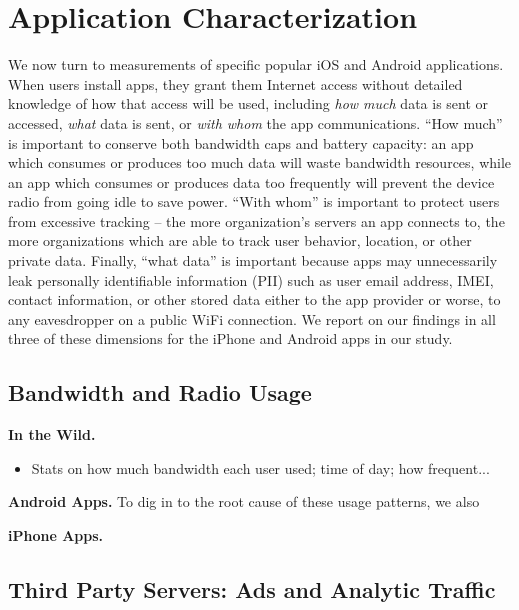 \section{Application Characterization}
\label{sec:characterize-app}

  We now turn to measurements of specific popular iOS and Android applications. 
  When users install apps, they grant them Internet access without detailed knowledge of how that access will be used, including {\it how much} data is sent or accessed, {\it what} data is sent,  or {\it with whom} the app communications.
  ``How much'' is important to conserve both bandwidth caps and battery capacity: an app which consumes or produces too much data will waste bandwidth resources, while an app which consumes or produces data too frequently will prevent the device radio from going idle to save power.
  ``With whom'' is important to protect users from excessive tracking -- the more organization's servers an app connects to, the more organizations which are able to track user behavior, location, or other private data.
  Finally, ``what data'' is important because apps may unnecessarily leak personally identifiable information (PII) such as user email address, IMEI, contact information, or other stored data either to the app provider or worse, to any eavesdropper on a public WiFi connection.
  We  report on our findings in all three of these dimensions for the iPhone and Android apps in our study.

\subsection{Bandwidth and Radio Usage}

  {\bf In the Wild.}
    \begin{itemize}
      \item Stats on how much bandwidth each user used; time of day; how frequent...
    \end{itemize}

  {\bf Android Apps.}
    To dig in to the root cause of these usage patterns, we also 

  {\bf iPhone Apps.}

\subsection{Third Party Servers: Ads and Analytic Traffic}

